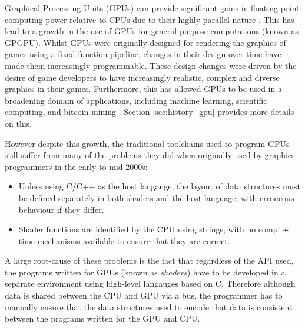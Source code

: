 \documentclass[a4paper,12pt,twoside,openright]{report}
\begin{document}

Graphical Processing Units (GPUs) can provide significant gains in
floating-point computing power relative to CPUs due to their highly parallel
nature \cite{CPUGPUOverTime}. This has lead to a growth in the use of GPUs for
general purpose computations (known as GPGPU). Whilst GPUs were originally
designed for rendering the graphics of games using a fixed-function pipeline,
changes in their design over time have made them increasingly programmable.
These design changes were driven by the desire of game developers to have
increasingly realistic, complex and diverse graphics in their games.
Furthermore, this has allowed GPUs to be used in a broadening domain of
applications, including machine learning, scientific computing, and bitcoin
mining \cite{GPUCrypto} \cite{GPUScientificComputing} \cite{GPUAI}. Section
\ref{sec:history_gpu} provides more details on this.

However despite this growth, the traditional toolchains used to program GPUs
still suffer from many of the problems they did when originally used by
graphics programmers in the early-to-mid 2000s:

\begin{itemize}

    \item Unless using C/C++ as the host langauge, the layout of data
    structures must be defined separately in both shaders and the host
    language, with erroneous behaviour if they differ.

    \item Shader functions are identified by the CPU using strings, with no
    compile-time mechanisms available to ensure that they are correct.


\end{itemize}

A large root-cause of these problems is the fact that regardless of the API
used, the programs written for GPUs (known as \textit{shaders}) have to be
developed in a separate environment using high-level langauges based on C.
Therefore although data is shared between the CPU and GPU via a bus, the
programmer has to manually ensure that the data structures used to encode that
data is consistent between the programs written for the GPU and CPU.
\end{document}
